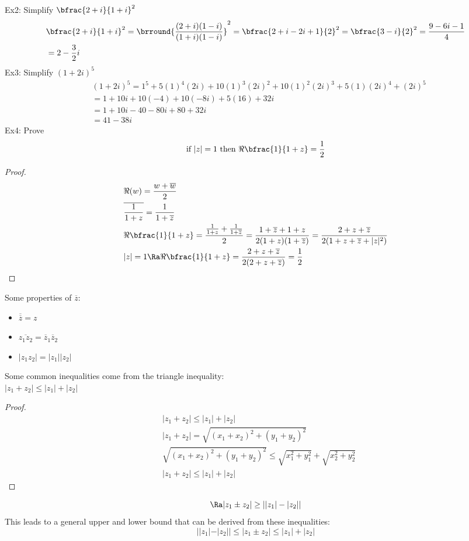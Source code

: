 Ex2: Simplify $\bfrac{2+i}{1+i}^2$
\begin{align*}
    &\bfrac{2+i}{1+i}^2=\brround{\frac{(2+i)(1-i)}{(1+i)(1-i)}}^2=\bfrac{2+i-2i+1}{2}^2=\bfrac{3-i}{2}^2=\frac{9-6i-1}{4}\\
    &=2-\frac{3}{2}i
\end{align*}
Ex3: Simplify $(1+2i)^5$
\begin{align*}
    &(1+2i)^5=1^5+5(1)^4(2i)+10(1)^3(2i)^2+10(1)^2(2i)^3+5(1)(2i)^4+(2i)^5\\
    &=1+10i+10(-4)+10(-8i)+5(16)+32i\\
    &=1+10i-40-80i+80+32i\\
    &=41-38i
\end{align*}
Ex4: Prove
\[ \text{if }|z|=1\text{ then }\Re\bfrac{1}{1+z}=\frac{1}{2} \]
\begin{proof}
\begin{align*}
    &\Re(w)=\frac{w+\overline{w}}{2}\\
    &\overline{\frac{1}{1+z}}=\frac{1}{1+\overline{z}}\\
    &\Re\bfrac{1}{1+z}=\frac{\frac{1}{1+z}+\frac{1}{1+\overline{z}}}{2}=\frac{1+\overline{z}+1+z}{2(1+z)(1+\overline{z})}=\frac{2+z+\overline{z}}{2(1+z+\overline{z}+|z|^2)}\\
    &|z|=1\Ra \Re\bfrac{1}{1+z}=\frac{2+z+\overline{z}}{2(2+z+\overline{z})}=\frac{1}{2}
\end{align*}
\end{proof}
Some properties of $\overline{z}$:
\begin{itemize}
    \item $\overline{\overline{z}}=z$
    \item $\overline{z_1z_2}=\overline{z}_1\overline{z}_2$
    \item $|z_1z_2|=|z_1||z_2|$
\end{itemize}
Some common inequalities come from the triangle inequality:\\
$|z_1+z_2|\leq |z_1|+|z_2|$
\begin{proof}
\begin{align*}
    &|z_1+z_2|\leq |z_1|+|z_2|\\
    &|z_1+z_2|=\sqrt{(x_1+x_2)^2+(y_1+y_2)^2}\\
    &\sqrt{(x_1+x_2)^2+(y_1+y_2)^2}\leq \sqrt{x_1^2+y_1^2}+\sqrt{x_2^2+y_2^2}\\
    &|z_1+z_2|\leq |z_1|+|z_2|
\end{align*}
\end{proof}
\[
\Ra |z_1\pm z_2|\geq ||z_1|-|z_2||
\]
This leads to a general upper and lower bound that can be derived from these inequalities:
$$||z_1|-|z_2||\leq|z_1\pm z_2|\leq |z_1|+|z_2|$$

